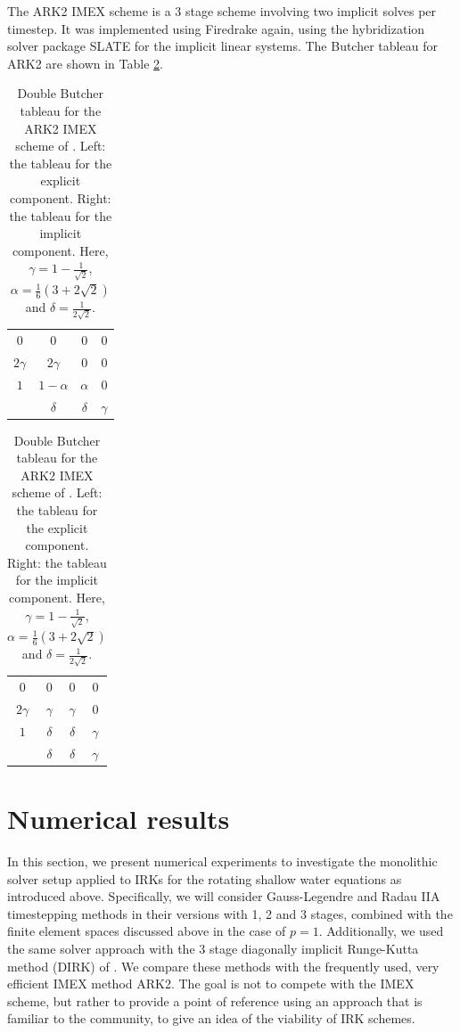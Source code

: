 \documentclass[a4paper, 12pt]{article}
\newcommand{\revisedA}[1]{#1}
\begin{document}
The ARK2 IMEX scheme is a 3 stage scheme involving two implicit solves
per timestep. It was implemented using Firedrake again, using the
hybridization solver package SLATE \citep{gibson2020slate} for the
implicit linear systems. The Butcher tableau for ARK2 are shown in Table
\ref{tab:ARK2}.

\begin{table}\centering
\begin{tabular}{c|ccc}
0         &  0             &   0       & 0  \\
$2\gamma$ &  $2\gamma$     &  0        & 0  \\
$1$       & $1 - \alpha$   & $\alpha$  & 0  \\ \hline
          & $\delta$       & $\delta$  & $\gamma$
\end{tabular}
\hspace{4mm}
\begin{tabular}{c|ccc}
0         &  0             &   0       & 0  \\
$2\gamma$ &  $\gamma$     &  $\gamma$        & 0  \\
$1$       & $\delta $   & $\delta$  & $\gamma$  \\ \hline
          & $\delta$       & $\delta$  & $\gamma$
\end{tabular}
\caption{\label{tab:ARK2}Double Butcher tableau for the ARK2 IMEX scheme of
  \citet{giraldo2013implicit}. Left: the tableau for the explicit component.
  Right: the tableau for the implicit component.
   Here, $\gamma = 1 -
  \frac{1}{\sqrt{2}}$, $\alpha = \frac{1}{6} (3 + 2\sqrt{2})$ and
  $\delta = \frac{1}{ 2 \sqrt{2}}$.}
\end{table}

\section{Numerical results}
\label{sec:results}

In this section, we present numerical experiments to investigate the
monolithic solver setup applied to IRKs for the rotating shallow water
equations as introduced above. Specifically, we will consider Gauss-Legendre and Radau IIA timestepping methods in their versions with 1,
2 and 3 stages, combined with the finite element spaces discussed
above in the case of $p=1$.
\revisedA{Additionally, we used the same solver approach with the 3 stage diagonally
   implicit Runge-Kutta method (DIRK) of \citet{alexander1977diagonally}.}
We compare these methods with the
frequently used, very efficient IMEX method ARK2.
\revisedA{The goal
  is not to compete with the IMEX scheme, but rather to provide a
  point of reference using an approach that is familiar to the community,
  to give an idea of the viability of IRK schemes.}
\end{document}
